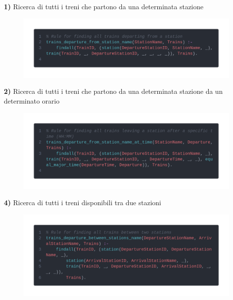 \documentclass[italian,12pt,a4paper]{article}
\begin{document}
	\textbf{1)} Ricerca di tutti i treni che partono da una determinata stazione
	\begin{figure}[!h]
		\centering
		\includegraphics[width=1.1\linewidth]{img/code1}
	\end{figure}

	\textbf{2)} Ricerca di tutti i treni che partono da una determinata stazione da un determinato orario
	\begin{figure}[!h]
		\centering
		\includegraphics[width=1.1\linewidth]{img/code2}
	\end{figure}

	\textbf{4)} Ricerca di tutti i treni disponibili tra due stazioni
	\begin{figure}[!h]
		\centering
		\includegraphics[width=1.1\linewidth]{img/code3}
	\end{figure}	
	
\end{document}
